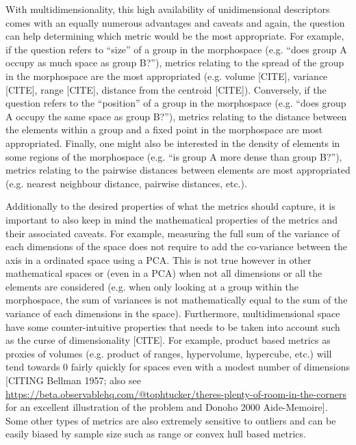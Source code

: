 \documentclass[12pt,letterpaper]{article}
\begin{document}
With multidimensionality, this high availability of unidimensional descriptors comes with an equally numerous advantages and caveats and again, the question can help determining which metric would be the most appropriate.
For example, if the question refers to ``size'' of a group in the morphospace (e.g. ``does group A occupy as much space as group B?''), metrics relating to the spread of the group in the morphospace are the most appropriated (e.g. volume [CITE], variance [CITE], range [CITE], distance from the centroid [CITE]).
Conversely, if the question refers to the ``position'' of a group in the morphospace (e.g. ``does group A occupy the same space as group B?''), metrics relating to the distance between the elements within a group and a fixed point in the morphospace are most appropriated.
Finally, one might also be interested in the density of elements in some regions of the morphospace (e.g. ``is group A more dense than group B?''), metrics relating to the pairwise distances between elements are most appropriated (e.g. nearest neighbour distance, pairwise distances, etc.).

Additionally to the desired properties of what the metrics should capture, it is important to also keep in mind the mathematical properties of the metrics and their associated caveats.
For example, measuring the full sum of the variance of each dimensions of the space does not require to add the co-variance between the axis in a ordinated space using a PCA.
This is not true however in other mathematical spaces or (even in a PCA) when not all dimensions or all the elements are considered (e.g. when only looking at a group within the morphospace, the sum of variances is not mathematically equal to the sum of the variance of each dimensions in the space).
Furthermore, multidimensional space have some counter-intuitive properties that needs to be taken into account such as the curse of dimensionality [CITE].
For example, product based metrics as proxies of volumes (e.g. product of ranges, hypervolume, hypercube, etc.) will tend towards 0 fairly quickly for spaces even with a modest number of dimensions [CITING Bellman 1957; also see \url{https://beta.observablehq.com/@tophtucker/theres-plenty-of-room-in-the-corners} for an excellent illustration of the problem and Donoho 2000 Aide-Memoire].
Some other types of metrics are also extremely sensitive to outliers and can be easily biased by sample size such as range or convex hull based metrics.
\end{document}
